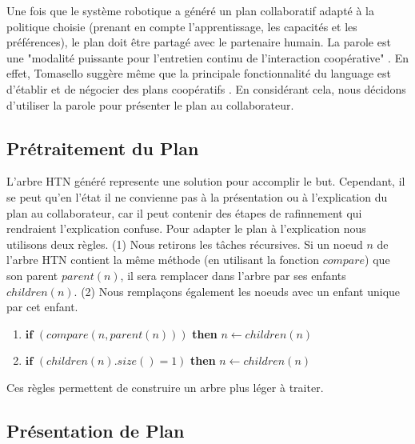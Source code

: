 \documentclass[a4paper,11pt,twoside]{StyleThese}
\begin{document}
Une fois que le système robotique a généré un plan collaboratif adapté à la politique choisie (prenant en compte l'apprentissage, les capacités et les préférences), le plan doit être partagé avec le partenaire humain.
La parole est une "modalité puissante pour l'entretien continu de l'interaction coopérative" \cite{Lallee2013}. En effet, Tomasello suggère même que la principale fonctionnalité du language est d'établir et de négocier des plans coopératifs \cite{tomasello2005}.
En considérant cela, nous décidons d'utiliser la parole pour présenter le plan au collaborateur.

\subsection{Prétraitement du Plan}
L'arbre HTN généré represente une solution pour accomplir le but. Cependant, il se peut qu'en l'état il ne convienne pas à la présentation ou à l'explication du plan au collaborateur, car il peut contenir des étapes de rafinnement qui rendraient l'explication confuse. Pour adapter le plan à l'explication nous utilisons deux règles.
%
(1) Nous retirons les tâches récursives. Si un noeud $n$ de l'arbre HTN contient la même méthode (en utilisant la fonction $compare$) que son parent $parent(n)$, il sera remplacer dans l'arbre par ses enfants $children(n)$. (2) Nous remplaçons également les noeuds avec un enfant unique par cet enfant.
\begin{enumerate}
\item $\textbf{if}$ $(compare(n, parent(n)))$ \textbf{then} $n \leftarrow children(n)$
\item $\textbf{if}$ $(children(n).size() = 1)$ \textbf{then} $n \leftarrow children(n)$
\end{enumerate}
Ces règles permettent de construire un arbre plus léger à traiter.



\subsection{Présentation de Plan}
\end{document}
